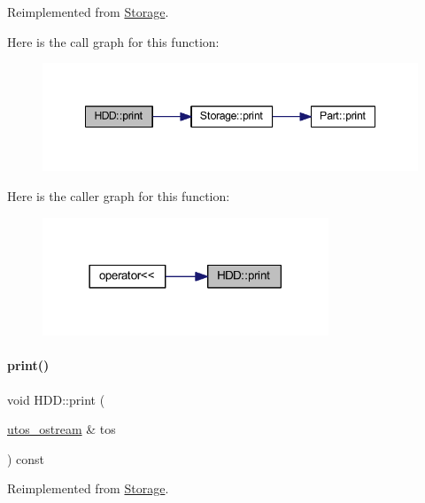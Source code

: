Reimplemented from \mbox{\hyperlink{class_storage_aa9f6ffb0fd45839b54bd4e254270445d}{Storage}}.

Here is the call graph for this function\+:
\nopagebreak
\begin{figure}[H]
\begin{center}
\leavevmode
\includegraphics[width=348pt]{class_h_d_d_a07c34356018542934a4dd91ce38b0821_cgraph}
\end{center}
\end{figure}
Here is the caller graph for this function\+:
\nopagebreak
\begin{figure}[H]
\begin{center}
\leavevmode
\includegraphics[width=242pt]{class_h_d_d_a07c34356018542934a4dd91ce38b0821_icgraph}
\end{center}
\end{figure}
\mbox{\label{class_h_d_d_aca2c2583fa3304917905cd9185b64539}} 
\paragraph{\texorpdfstring{print()}{print()}\hspace{0.1cm}{\footnotesize\ttfamily [2/4]}}
{\footnotesize\ttfamily void H\+D\+D\+::print (\begin{DoxyParamCaption}\item[{\mbox{\hyperlink{structutos__ostream}{utos\+\_\+ostream}} \&}]{tos }\end{DoxyParamCaption}) const\hspace{0.3cm}{\ttfamily [virtual]}}



Reimplemented from \mbox{\hyperlink{class_storage_ab7ecf9e0777891b4e1a84bbf391a1cd4}{Storage}}.

